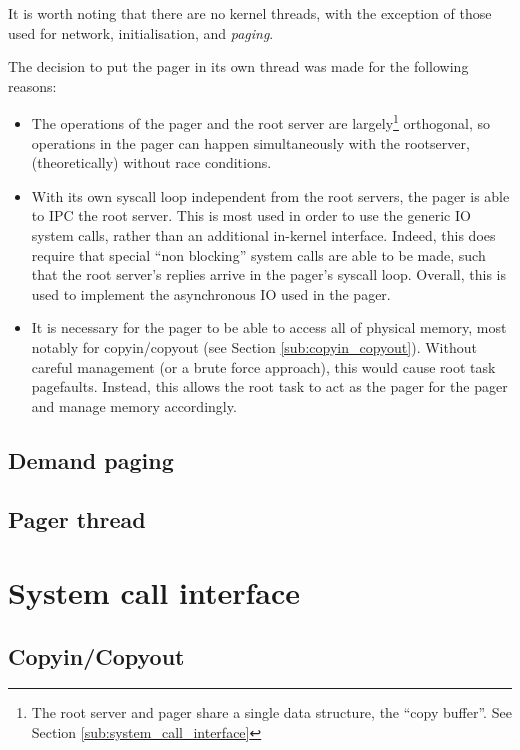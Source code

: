 \documentclass[12pt,english]{article}
\begin{document}
It is worth noting that there are no kernel threads, with the exception of those used for network, initialisation, and \emph{paging}.

The decision to put the pager in its own thread was made for the following reasons:
\begin{itemize}
\item The operations of the pager and the root server are largely\footnote{The root server and pager share a single data structure, the ``copy buffer''.  See Section \ref{sub:system_call_interface}} orthogonal, so operations in the pager can happen simultaneously with the rootserver, (theoretically) without race conditions.
\item With its own syscall loop independent from the root servers, the pager is able to IPC the root server.  This is most used in order to use the generic IO system calls, rather than an additional in-kernel interface.  Indeed, this does require that special ``non blocking'' system calls are able to be made, such that the root server's replies arrive in the pager's syscall loop.  Overall, this is used to implement the asynchronous IO used in the pager.
\item It is necessary for the pager to be able to access all of physical memory, most notably for copyin/copyout (see Section \ref{sub:copyin_copyout}).  Without careful management (or a brute force approach), this would cause root task pagefaults.  Instead, this allows the root task to act as the pager for the pager and manage memory accordingly.
\end{itemize}

\subsection{Demand paging} \label{sub:demand_paging}

\subsection{Pager thread}


\section{System call interface}

\subsection{Copyin/Copyout}
\end{document}
